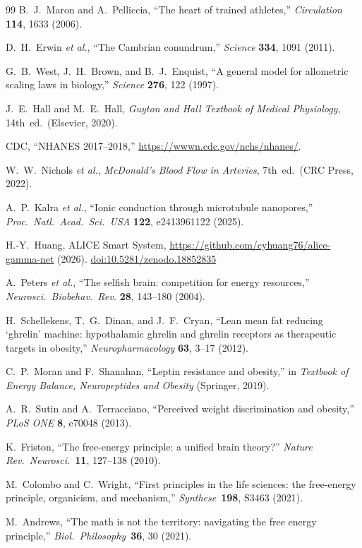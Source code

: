 \documentclass[aps,pre,twocolumn,superscriptaddress,floatfix]{revtex4-2}
\begin{document}
\begin{thebibliography}{99}
B.~J.~Maron and A.~Pelliccia,
``The heart of trained athletes,''
\emph{Circulation} \textbf{114}, 1633 (2006).

D.~H.~Erwin \emph{et al.}, ``The Cambrian conundrum,''
\emph{Science} \textbf{334}, 1091 (2011).

G.~B.~West, J.~H.~Brown, and B.~J.~Enquist,
``A general model for allometric scaling laws in biology,''
\emph{Science} \textbf{276}, 122 (1997).

J.~E.~Hall and M.~E.~Hall, \emph{Guyton and Hall Textbook of
Medical Physiology}, 14th~ed.\ (Elsevier, 2020).

CDC, ``NHANES 2017--2018,''
\url{https://wwwn.cdc.gov/nchs/nhanes/}.

W.~W.~Nichols \emph{et al.}, \emph{McDonald's Blood Flow in
Arteries}, 7th~ed.\ (CRC Press, 2022).

A.~P.~Kalra \emph{et al.}, ``Ionic conduction through
microtubule nanopores,'' \emph{Proc.\ Natl.\ Acad.\ Sci.\
USA} \textbf{122}, e2413961122 (2025).

H.-Y.~Huang, ALICE Smart System,
\url{https://github.com/cyhuang76/alice-gamma-net} (2026).
\href{https://doi.org/10.5281/zenodo.18852835}{doi:10.5281/zenodo.18852835}

A.~Peters \emph{et al.}, ``The selfish brain: competition
for energy resources,''
\emph{Neurosci.\ Biobehav.\ Rev.} \textbf{28}, 143--180
(2004).

H.~Schellekens, T.~G.~Dinan, and J.~F.~Cryan,
``Lean mean fat reducing `ghrelin' machine: hypothalamic
ghrelin and ghrelin receptors as therapeutic targets in
obesity,''
\emph{Neuropharmacology} \textbf{63}, 3--17 (2012).

C.~P.~Moran and F.~Shanahan,
``Leptin resistance and obesity,''
in \emph{Textbook of Energy Balance, Neuropeptides and
Obesity} (Springer, 2019).

A.~R.~Sutin and A.~Terracciano,
``Perceived weight discrimination and obesity,''
\emph{PLoS ONE} \textbf{8}, e70048 (2013).

K.~Friston, ``The free-energy principle: a unified brain
theory?'' \emph{Nature Rev.\ Neurosci.}\ \textbf{11},
127--138 (2010).

M.~Colombo and C.~Wright, ``First principles in the life
sciences: the free-energy principle, organicism, and
mechanism,'' \emph{Synthese}\ \textbf{198}, S3463 (2021).

M.~Andrews, ``The math is not the territory: navigating the
free energy principle,'' \emph{Biol.\ Philosophy}\
\textbf{36}, 30 (2021).

\end{thebibliography}
\end{document}
